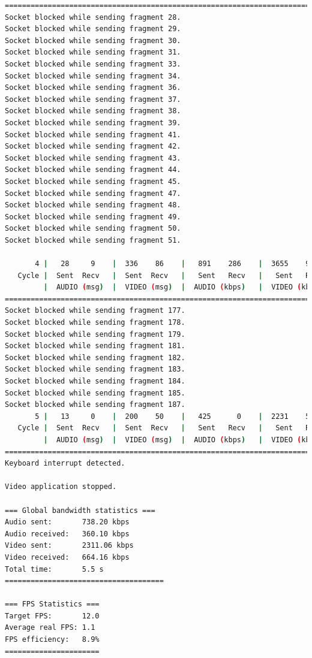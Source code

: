 \begin{lstlisting}[language=bash,basicstyle=\ttfamily\tiny]
===========================================================================================
Socket blocked while sending fragment 28.
Socket blocked while sending fragment 29.
Socket blocked while sending fragment 30.
Socket blocked while sending fragment 31.
Socket blocked while sending fragment 33.
Socket blocked while sending fragment 34.
Socket blocked while sending fragment 36.
Socket blocked while sending fragment 37.
Socket blocked while sending fragment 38.
Socket blocked while sending fragment 39.
Socket blocked while sending fragment 41.
Socket blocked while sending fragment 42.
Socket blocked while sending fragment 43.
Socket blocked while sending fragment 44.
Socket blocked while sending fragment 45.
Socket blocked while sending fragment 47.
Socket blocked while sending fragment 48.
Socket blocked while sending fragment 49.
Socket blocked while sending fragment 50.
Socket blocked while sending fragment 51.

       4 |   28     9    |  336    86    |   891    286    |  3655    936    |  33     66       
   Cycle |  Sent  Recv   |  Sent  Recv   |   Sent   Recv   |   Sent   Recv   | Program System
         |  AUDIO (msg)  |  VIDEO (msg)  |  AUDIO (kbps)   |  VIDEO (kbps)   |     CPU (%) 
===========================================================================================
Socket blocked while sending fragment 177.
Socket blocked while sending fragment 178.
Socket blocked while sending fragment 179.
Socket blocked while sending fragment 181.
Socket blocked while sending fragment 182.
Socket blocked while sending fragment 183.
Socket blocked while sending fragment 184.
Socket blocked while sending fragment 185.
Socket blocked while sending fragment 187.
       5 |   13     0    |  200    50    |   425      0    |  2231    559    |  16     59       
   Cycle |  Sent  Recv   |  Sent  Recv   |   Sent   Recv   |   Sent   Recv   | Program System
         |  AUDIO (msg)  |  VIDEO (msg)  |  AUDIO (kbps)   |  VIDEO (kbps)   |     CPU (%) 
===========================================================================================
Keyboard interrupt detected.

Video application stopped.

=== Global bandwidth statistics ===
Audio sent:       738.20 kbps
Audio received:   360.10 kbps
Video sent:       2311.06 kbps
Video received:   664.16 kbps
Total time:       5.5 s
=====================================

=== FPS Statistics ===
Target FPS:       12.0
Average real FPS: 1.1
FPS efficiency:   8.9%
======================


\end{lstlisting}
